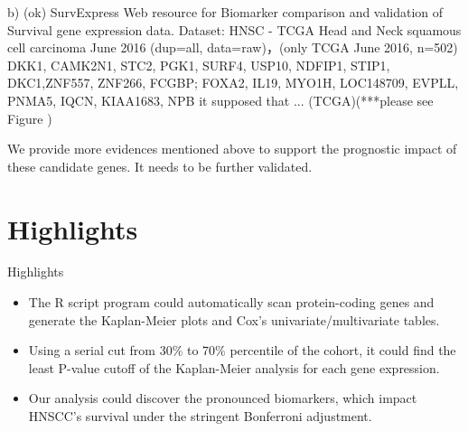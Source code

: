 \documentclass[preprint,12pt]{elsarticle}
\newenvironment{MyColorPar}[1]{%
    \leavevmode\color{#1}\ignorespaces%
}{%
}%
\begin{document}
\begin{MyColorPar}{blue}
b) (ok) SurvExpress
Web resource for Biomarker comparison and validation of Survival gene expression data. 
Dataset: HNSC - TCGA Head and Neck squamous cell carcinoma June 2016 (dup=all, data=raw)，(only TCGA June 2016, n=502) \cite{Aguirre-Gamboa2013}
DKK1, CAMK2N1, STC2, PGK1, SURF4, USP10, NDFIP1, STIP1, DKC1,ZNF557, ZNF266, FCGBP;
FOXA2, IL19, MYO1H, LOC148709, EVPLL, PNMA5, IQCN, KIAA1683, NPB
it supposed that ...
 (TCGA)(***please see Figure \label{fig_SurvExpress})

We provide more evidences mentioned above to support the prognostic impact of these candidate genes. It needs to be further validated.
\end{MyColorPar}


\section{Highlights}
Highlights
\begin{itemize}
    \item The R script program could automatically scan protein-coding genes and generate the Kaplan-Meier plots and Cox's univariate/multivariate tables.
    \item Using a serial cut from 30\% to 70\% percentile of the cohort, it could find the least P-value cutoff of the Kaplan-Meier analysis for each gene expression.
    \item Our analysis could discover the pronounced biomarkers, which impact HNSCC's survival under the stringent Bonferroni adjustment.
\end{itemize}



%

\end{document}
